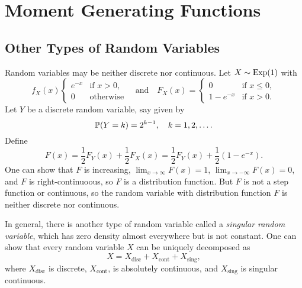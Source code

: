 \chapter{Moment Generating Functions}

\section{Other Types of Random Variables}
\begin{remark}
  Random variables may be neither discrete nor
  continuous. Let $X \sim \operatorname{Exp}(1)$ with
  \[
    f_X(x)
    \begin{cases}
      e^{-x} & \text{if $x > 0$}, \\
      0 & \text{otherwise}
    \end{cases}
    \quad \text{and} \quad
    F_X(x) =
    \begin{cases}
      0 & \text{if $x \leq 0$}, \\
      1 - e^{-x} & \text{if $x > 0$}.
    \end{cases}
  \]
  Let $Y$ be a discrete random variable, say
  given by
  \[
    \mathbb{P}(Y = k) = 2^{k - 1}, \quad k = 1, 2, \ldots.
  \]
  Define
  \[
    F(x) = \frac{1}{2} F_Y(x) + \frac{1}{2} F_X(x)
    = \frac{1}{2} F_Y(x) + \frac{1}{2}(1 - e^{-x}).
  \]
  One can show that
  $F$ is increasing, $\lim_{x \to \infty} F(x) = 1$,
  $\lim_{x \to -\infty} F(x) = 0$, and $F$ is
  right-continuoous, so $F$ is a distribution function.
  But $F$ is not a step function or continuous, so
  the random variable with distribution function
  $F$ is neither discrete nor continuous.
\end{remark}

\begin{remark}
  In general, there is another type of random
  variable called a \emph{singular random variable},
  which has zero density almost everywhere but is
  not constant. One can show that every random
  variable $X$ can be uniquely decomposed as
  \[
    X = X_{\text{disc}} + X_{\text{cont}} + X_{\text{sing}},
  \]
  where $X_{\text{disc}}$ is discrete, $X_{\text{cont}}$,
  is absolutely continuous, and
  $X_{\text{sing}}$ is singular continuous.
\end{remark}
